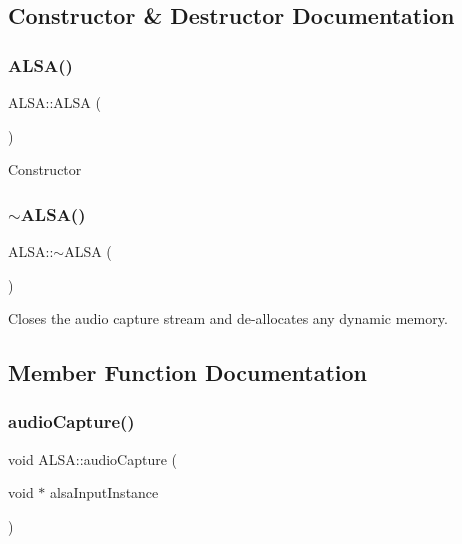 \subsection{Constructor \& Destructor Documentation}
\hypertarget{classALSA_a7523f4f0edec34cf75a3fa2197f70a03}{}\label{classALSA_a7523f4f0edec34cf75a3fa2197f70a03} 
\subsubsection{\texorpdfstring{A\+L\+S\+A()}{ALSA()}}
{\ttfamily A\+L\+S\+A\+::\+A\+L\+SA (\begin{DoxyParamCaption}{ }\end{DoxyParamCaption})}

Constructor \hypertarget{classALSA_a80e4d6d916fd10a25e6c54da0f43af0d}{}\label{classALSA_a80e4d6d916fd10a25e6c54da0f43af0d} 
\subsubsection{\texorpdfstring{$\sim$\+A\+L\+S\+A()}{~ALSA()}}
{\ttfamily A\+L\+S\+A\+::$\sim$\+A\+L\+SA (\begin{DoxyParamCaption}{ }\end{DoxyParamCaption})}

Closes the audio capture stream and de-\/allocates any dynamic memory. 

\subsection{Member Function Documentation}
\hypertarget{classALSA_a3a3015c0dcdc2cdf1a9527fb6ffe5bc7}{}\label{classALSA_a3a3015c0dcdc2cdf1a9527fb6ffe5bc7} 
\subsubsection{\texorpdfstring{audio\+Capture()}{audioCapture()}}
{\ttfamily void A\+L\+S\+A\+::audio\+Capture (\begin{DoxyParamCaption}\item[{void $\ast$}]{alsa\+Input\+Instance }\end{DoxyParamCaption})\hspace{0.3cm}{\ttfamily [static]}}

